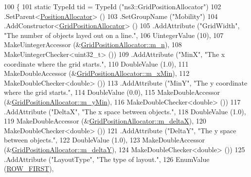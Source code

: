 \begin{DoxyCode}
100 \{
101   \textcolor{keyword}{static} TypeId tid = TypeId (\textcolor{stringliteral}{"ns3::GridPositionAllocator"})
102     .SetParent<\hyperlink{classns3_1_1PositionAllocator_a944cf6b97b874e06983c1f3e81cf3ea6}{PositionAllocator}> ()
103     .SetGroupName (\textcolor{stringliteral}{"Mobility"})
104     .AddConstructor<\hyperlink{classns3_1_1GridPositionAllocator_a910d9ecd1307dc2c7abf49e833d2286b}{GridPositionAllocator}> ()
105     .AddAttribute (\textcolor{stringliteral}{"GridWidth"}, \textcolor{stringliteral}{"The number of objects layed out on a line."},
106                    UintegerValue (10),
107                    MakeUintegerAccessor (&\hyperlink{classns3_1_1GridPositionAllocator_ae66a6e6c931f2444651650bedc9a1cc4}{GridPositionAllocator::m\_n}),
108                    MakeUintegerChecker<uint32\_t> ())
109     .AddAttribute (\textcolor{stringliteral}{"MinX"}, \textcolor{stringliteral}{"The x coordinate where the grid starts."},
110                    DoubleValue (1.0),
111                    MakeDoubleAccessor (&\hyperlink{classns3_1_1GridPositionAllocator_ad9c31c86707754e445ba7543537d693e}{GridPositionAllocator::m\_xMin}),
112                    MakeDoubleChecker<double> ())
113     .AddAttribute (\textcolor{stringliteral}{"MinY"}, \textcolor{stringliteral}{"The y coordinate where the grid starts."},
114                    DoubleValue (0.0),
115                    MakeDoubleAccessor (&\hyperlink{classns3_1_1GridPositionAllocator_a7f2c8a8cdd6799e48d77c90181fd6fe8}{GridPositionAllocator::m\_yMin}),
116                    MakeDoubleChecker<double> ())
117     .AddAttribute (\textcolor{stringliteral}{"DeltaX"}, \textcolor{stringliteral}{"The x space between objects."},
118                    DoubleValue (1.0),
119                    MakeDoubleAccessor (&\hyperlink{classns3_1_1GridPositionAllocator_a09ae12ea1721ea8c9ad0ac2ea268560e}{GridPositionAllocator::m\_deltaX}),
120                    MakeDoubleChecker<double> ())
121     .AddAttribute (\textcolor{stringliteral}{"DeltaY"}, \textcolor{stringliteral}{"The y space between objects."},
122                    DoubleValue (1.0),
123                    MakeDoubleAccessor (&\hyperlink{classns3_1_1GridPositionAllocator_a1e266d88a85f5cf399e5ff5762c23b83}{GridPositionAllocator::m\_deltaY}),
124                    MakeDoubleChecker<double> ())
125     .AddAttribute (\textcolor{stringliteral}{"LayoutType"}, \textcolor{stringliteral}{"The type of layout."},
126                    EnumValue (\hyperlink{classns3_1_1GridPositionAllocator_a31cab553ee810e780d5dce3ed4336b15ae2c3a68ac2b72dfc65ed3e7422e57fc9}{ROW\_FIRST}),

\end{DoxyCode}
